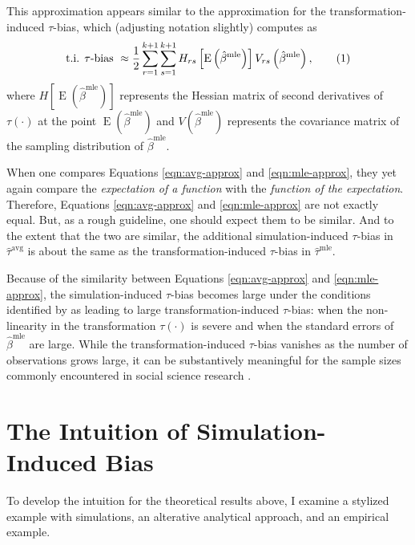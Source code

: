 \documentclass[12pt]{article}
\newcommand\numberthis{\addtocounter{equation}{1}\tag{\theequation}}
\DeclareMathOperator*{\E}{\text{E}}
\begin{document}
This approximation appears similar to the approximation for the transformation-induced $\tau$-bias, which (adjusting notation slightly) \citet[p. 405, Eq. 1]{Rainey2017} computes as
\begin{align*}
\text{t.i. } \tau \text{-bias } \approx \dfrac{1}{2} \displaystyle \sum_{r = 1}^{k+1} \sum_{s = 1}^{k+1} H_{rs}\left[ \E \left( \hat{\beta}^\text{mle} \right) \right] V_{rs} \left( \hat{\beta}^{\text{mle}} \right), \numberthis \label{eqn:mle-approx}
\end{align*}
where $H\left[ \E \left( \hat{\beta}^\text{mle} \right) \right]$ represents the Hessian matrix of second derivatives of $\tau(\cdot)$ at the point $\E \left( \hat{\beta}^\text{mle} \right)$ and $V \left( \hat{\beta}^{\text{mle}} \right)$ represents the covariance matrix of the sampling distribution of $\hat{\beta}^\text{mle}$.

When one compares Equations \ref{eqn:avg-approx} and \ref{eqn:mle-approx}, they yet again compare the \textit{expectation of a function} with the \textit{function of the expectation}.
Therefore, Equations \ref{eqn:avg-approx} and \ref{eqn:mle-approx} are not exactly equal.
But, as a rough guideline, one should expect them to be similar.
And to the extent that the two are similar, the additional simulation-induced $\tau$-bias in $\hat{\tau}^\text{avg}$ is about the same as the transformation-induced $\tau$-bias in $\hat{\tau}^\text{mle}$. 

Because of the similarity between Equations \ref{eqn:avg-approx} and \ref{eqn:mle-approx}, the simulation-induced $\tau$-bias becomes large under the conditions identified by \cite{Rainey2017} as leading to large transformation-induced $\tau$-bias: when the non-linearity in the transformation $\tau(\cdot)$ is severe and when the standard errors of $\hat{\beta}^\text{mle}$ are large.
While the transformation-induced $\tau$-bias vanishes as the number of observations grows large, it can be substantively meaningful for the sample sizes commonly encountered in social science research \citep{Rainey2017}.

\section*{The Intuition of Simulation-Induced Bias}

To develop the intuition for the theoretical results above, I examine a stylized example with simulations, an alterative analytical approach, and an empirical example.
\end{document}
